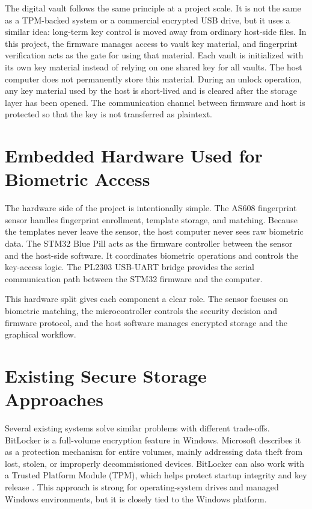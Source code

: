 The digital vault follows the same principle at a project scale. It is not the same as a TPM-backed system or a commercial encrypted USB drive, but it uses a similar idea: long-term key control is moved away from ordinary host-side files. In this project, the firmware manages access to vault key material, and fingerprint verification acts as the gate for using that material. Each vault is initialized with its own key material instead of relying on one shared key for all vaults. The host computer does not permanently store this material. During an unlock operation, any key material used by the host is short-lived and is cleared after the storage layer has been opened. The communication channel between firmware and host is protected so that the key is not transferred as plaintext.

\section{Embedded Hardware Used for Biometric Access}

The hardware side of the project is intentionally simple. The AS608 fingerprint sensor handles fingerprint enrollment, template storage, and matching. Because the templates never leave the sensor, the host computer never sees raw biometric data. The STM32 Blue Pill acts as the firmware controller between the sensor and the host-side software. It coordinates biometric operations and controls the key-access logic. The PL2303 USB-UART bridge provides the serial communication path between the STM32 firmware and the computer.

This hardware split gives each component a clear role. The sensor focuses on biometric matching, the microcontroller controls the security decision and firmware protocol, and the host software manages encrypted storage and the graphical workflow.

\section{Existing Secure Storage Approaches}

Several existing systems solve similar problems with different trade-offs. BitLocker is a full-volume encryption feature in Windows. Microsoft describes it as a protection mechanism for entire volumes, mainly addressing data theft from lost, stolen, or improperly decommissioned devices. BitLocker can also work with a Trusted Platform Module (TPM), which helps protect startup integrity and key release \cite{microsoftBitlocker}. This approach is strong for operating-system drives and managed Windows environments, but it is closely tied to the Windows platform.

